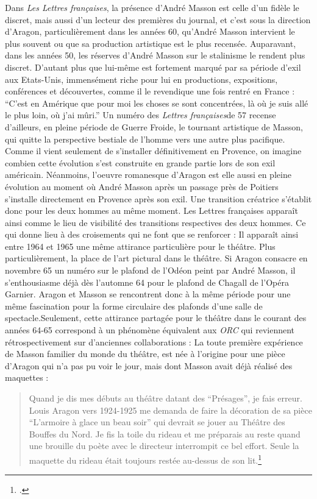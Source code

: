 	Dans \emph{Les Lettres françaises}, la présence d’André Masson est celle d’un fidèle le discret, mais aussi d’un lecteur des premières du journal, et c’est sous la direction d’Aragon, particulièrement dans les années 60, qu’André Masson intervient le plus souvent ou que sa production artistique est le plus recensée. Auparavant, dans les années 50, les réserves d’André Masson sur le stalinisme le rendent plus discret. D’autant plus que lui-même est fortement marqué par sa période d’exil aux Etats-Unis, immensément riche pour lui en productions, expositions, conférences et découvertes, comme il le revendique une fois rentré en France : \enquote{C’est en Amérique que pour moi les choses se sont concentrées, là où je suis allé le plus loin, où j’ai mûri.} Un numéro des \emph{Lettres françaises}de 57 recense d’ailleurs, en pleine période de Guerre Froide, le tournant artistique de Masson, qui quitte la perspective bestiale de l’homme vers une autre plus pacifique. Comme il vient seulement de s’installer définitivement en Provence, on imagine combien cette évolution s’est construite en grande partie lors de son exil américain. Néanmoins, l’oeuvre romanesque d’Aragon est elle aussi en pleine évolution au moment où André Masson après un passage près de Poitiers s’installe directement en Provence après son exil. Une transition créatrice s’établit donc pour les deux hommes au même moment. Les Lettres françaises apparaît ainsi comme le lieu de visibilité des transitions respectives des deux hommes. Ce qui donne lieu à des croisements qui ne font que se renforcer : Il apparaît ainsi entre 1964 et 1965 une même attirance particulière pour le théâtre. Plus particulièrement, la place de l’art pictural dans le théâtre. Si Aragon consacre en novembre 65 un numéro sur le plafond de l’Odéon peint par André Masson, il s’enthousiasme déjà dès l’automne 64 pour le plafond de Chagall de l’Opéra Garnier. Aragon et Masson se rencontrent donc à la même période pour une même fascination pour la forme circulaire des plafonds d’une salle de spectacle.Seulement, cette attirance partagée pour le théâtre dans le courant des années 64-65 correspond à un phénomène équivalent aux \emph{ORC} qui reviennent rétrospectivement sur d'anciennes collaborations : La toute première expérience de Masson familier du monde du théâtre, est née à l'origine pour une pièce d'Aragon qui n'a pas pu voir le jour, mais dont Masson avait déjà réalisé des maquettes : 
\begin{quote}
Quand je dis mes débuts au théâtre datant des \enquote{Présages}, je fais erreur. Louis Aragon vers 1924-1925 me demanda de faire la décoration de sa pièce \enquote{L'armoire à glace un beau soir} qui devrait se jouer au Théâtre des Bouffes du Nord. Je fis la toile du rideau et me préparais au reste quand une brouille du poète avec le directeur interrompit ce bel effort. Seule la maquette du rideau était toujours restée au-dessus de son lit.\footcite[p19]{catalogue}
\end{quote}
	
